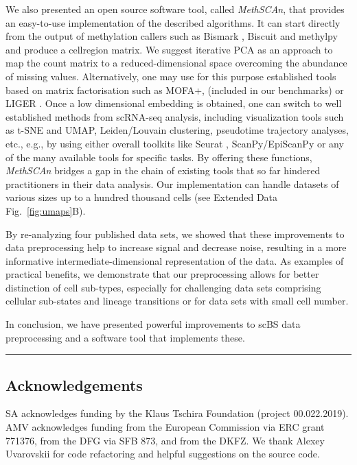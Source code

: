 \documentclass[10pt]{article}
\begin{document}
We also presented an open source software tool, called \textit{MethSCAn}, that provides an easy-to-use implementation of the described algorithms.
It can start directly from the output of methylation callers such as Bismark \citep{bismark}, Biscuit \citep{biscuit} and methylpy \citep{methylpy} and produce a cell\texttimes region matrix.
We suggest iterative PCA as an approach to map the count matrix to a reduced-dimensional space overcoming the abundance of missing values.
Alternatively, one may use for this purpose established tools based on matrix factorisation such as MOFA+, \citep{argelaguet2020mofa} (included in our benchmarks) or LIGER \citep{welch2019single}.
Once a low dimensional embedding is obtained, one can switch to well established methods from scRNA-seq analysis, including visualization tools such as t-SNE and UMAP, Leiden/Louvain clustering, pseudotime trajectory analyses, etc., e.g., by using either overall toolkits like Seurat \citep{seurat5}, ScanPy/EpiScanPy \citep{Wolf_2018,danese2021episcanpy} or any of the many available tools for specific tasks.
By offering these functions, \textit{MethSCAn} bridges a gap in the chain of existing tools that so far hindered practitioners in their data analysis.
Our implementation can handle datasets of various sizes up to a hundred thousand cells (see Extended Data Fig.~\ref{fig:umaps}B).

By re-analyzing four published data sets, we showed that these improvements to data preprocessing help to increase signal and decrease noise, resulting in a more informative intermediate-dimensional representation of the data.
As examples of practical benefits, we demonstrate that our preprocessing allows for better distinction of cell sub-types, especially for challenging data sets comprising cellular sub-states and lineage transitions or for data sets with small cell number.

In conclusion, we have presented powerful improvements to scBS data preprocessing and a software tool that implements these.

\vspace{1.4ex}
\noindent\hfil\rule{.6\columnwidth}{.2pt}\hfil


\subsection*{Acknowledgements}

SA acknowledges funding by the Klaus Tschira Foundation (project 00.022.2019).
AMV acknowledges funding from the European Commission via ERC grant 771376, from the DFG via SFB 873, and from the DKFZ.
We thank Alexey Uvarovskii for code refactoring and helpful suggestions on the source code.
\end{document}
